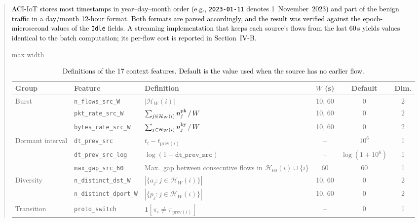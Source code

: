 \documentclass[11pt]{article}
\newenvironment{excerpt}{\begin{quote}\sloppy}{\end{quote}}
\begin{document}
\begin{excerpt}
\textcolor{black}{ACI-IoT stores most timestamps in
year--day--month order (e.g., \texttt{2023-01-11} denotes
1~November~2023) and part of the benign traffic in a day/month
12-hour format. Both formats are parsed accordingly, and the result
was verified against the epoch-microsecond values of the
\texttt{Idle} fields. A streaming implementation that keeps each
source's flows from the last 60\,s yields values identical to the
batch computation; its per-flow cost is reported in
Section~IV-B.}

\setcounter{table}{3}
\begin{table}[H]
\centering
\scriptsize
\caption{\textcolor{black}{Definitions of the 17 context
features. Default is the value used when the source has no earlier
flow.}}

\color{black}
\setlength{\tabcolsep}{6pt}
\renewcommand{\arraystretch}{1.25}
\begin{adjustbox}{max width=\linewidth}
\begin{tabular}{l l >{\raggedright\arraybackslash}p{4.3cm} c c c}
\hline\toprule
\textbf{Group} & \textbf{Feature} & \textbf{Definition} & \textbf{$W$ (s)} & \textbf{Default} & \textbf{Dim.} \\
\hline\toprule
\multirow{3}{*}{Burst}
 & \texttt{n\_flows\_src\_W}    & $|\mathcal{H}_W(i)|$ & 10, 60 & 0 & 2 \\
 & \texttt{pkt\_rate\_src\_W}   & $\sum_{j\in\mathcal{H}_W(i)} n^{\rm pk}_j \,/\, W$ & 10, 60 & 0 & 2 \\
 & \texttt{bytes\_rate\_src\_W} & $\sum_{j\in\mathcal{H}_W(i)} n^{\rm by}_j \,/\, W$ & 10, 60 & 0 & 2 \\
\midrule
\multirow{3}{*}{Dormant interval}
 & \texttt{dt\_prev\_src}     & $t_i-t_{\mathrm{prev}(i)}$ & -- & $10^{6}$ & 1 \\
 & \texttt{dt\_prev\_src\_log} & $\log(1+\texttt{dt\_prev\_src})$ & -- & $\log(1+10^{6})$ & 1 \\
 & \texttt{max\_gap\_src\_60}  & Max.\ gap between consecutive flows in $\mathcal{H}_{60}(i)\cup\{i\}$ & 60 & 60 & 1 \\
\midrule
\multirow{2}{*}{Diversity}
 & \texttt{n\_distinct\_dst\_W}   & $|\{a_j: j\in\mathcal{H}_W(i)\}|$ & 10, 60 & 0 & 2 \\
 & \texttt{n\_distinct\_dport\_W} & $|\{p_j: j\in\mathcal{H}_W(i)\}|$ & 10, 60 & 0 & 2 \\
\midrule
\multirow{4}{*}{Transition}
 & \texttt{proto\_switch}       & $\mathbf{1}[\pi_i\neq\pi_{\mathrm{prev}(i)}]$ & -- & 0 & 1 \\

\end{tabular}
\end{adjustbox}
\end{table}
\end{excerpt}
\end{document}
